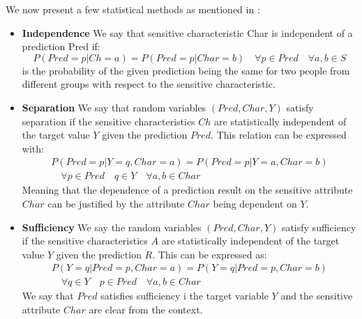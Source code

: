 We now present a few statistical methods as mentioned in \cite{fairness_ml_book_2017}:
\begin{itemize}


    \item \textbf{Independence}
        We say that sensitive characteristic Char is independent of a prediction Pred if:
        \begin{equation}
            P\left(Pred = p|Ch = a\right)=P\left(Pred=p|Char=b\right) \quad \forall p\in Pred \quad \forall a,b \in S
        \end{equation}
        is the probability of the given prediction being the same for two people from different groups with respect to the sensitive characteristic.
    
    
    \item \textbf{Separation}
        We say that random variables $(Pred,Char,Y)$ satisfy separation if the sensitive characteristics $Ch$ are statistically independent of the target value $Y$ given the prediction $Pred$.
        This relation can be expressed with:
        \begin{equation}
        \begin{split}
            P\left(Pred=p|Y=q,Char=a\right)=P\left(Pred=p|Y=a,Char=b\right) \\
            \quad \forall p\in Pred\quad q \in Y \quad \forall a,b \in Char
        \end{split}
        \end{equation}
        Meaning that the dependence of a prediction result on the sensitive attribute $Char$ can be justified by the attribute $Char$ being dependent on $Y$.

    \item \textbf{Sufficiency}
        We say the random variables $(Pred,Char,Y)$ satisfy sufficiency if the sensitive characteristics $A$ are statistically independent of the target value $Y$ given the prediction $R$. This can be expressed as:
        \begin{equation}
        \begin{split}
            P\left(Y=q|Pred=p,Char=a\right)=P\left(Y=q|Pred=p,Char=b\right) \\
            \quad \forall q\in Y\quad p \in Pred \quad \forall a,b \in Char
        \end{split}
        \end{equation}
        We say that $Pred$ satisfies sufficiency i the target variable $Y$ and the sensitive attribute $Char$ are clear from the context.

    
\end{itemize}


